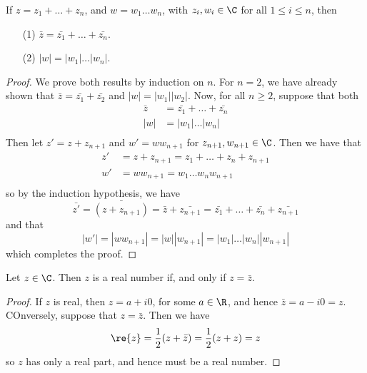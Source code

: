 \begin{corollary}
    If $z=z_1+\dots+z_n$, and $w=w_1 \dots w_n$, with $z_i,w_i \in \C$ for all
    $1 \leq i \leq n$, then
    \begin{enumerate}
        \item[(1)] $\bar{z}=\bar{z_1}+\dots+\bar{z_n}$.

        \item[(2)] $|w|=|w_1| \dots |w_n|$.
    \end{enumerate}
\end{corollary}
\begin{proof}
    We prove both results by induction on $n$. For  $n=2$, we have already shown
    that  $\bar{z}=\bar{z_1}+\bar{z_2}$ and $|w|=|w_1||w_2|$. Now, for
    all $n \geq 2$, suppose that both
    \begin{align*}
        \bar{z} &=  \bar{z_1}+\dots+\bar{z_n}   \\
        |w|   &=  |w_1| \dots |w_n|   \\
    \end{align*}
    Then let $z'=z+z_{n+1}$ and $w'=ww_{n+1}$ for $z_{n+1},w_{n+1} \in \C$. Then
    we have that
    \begin{align*}
        z'  &= z+z_{n+1}    = z_1+\dots+z_n+z_{n+1}   \\
        w'  &=  ww_{n+1}    =   w_1 \dots w_n w_{n+1}   \\
    \end{align*}
    so by the induction hypothesis, we have
    \begin{equation*}
        \bar{z'}=\bar{(z+z_{n+1})}=\bar{z}+\bar{z_{n+1}}=\bar{z_1}+\dots+\bar{z_n}+
        \bar{z_{n+1}}
    \end{equation*}
    and that
    \begin{equation*}
        |w'|=|ww_{n+1}|=|w||w_{n+1}|=|w_1| \dots |w_n| |w_{n+1}|
    \end{equation*}
    which completes the proof.
\end{proof}

\begin{lemma}\label{1.1.4}
    Let $z \in \C$. Then $z$ is a real number if, and only if  $z=\bar{z}$.
\end{lemma}
\begin{proof}
    If $z$ is real, then  $z=a+i0$, for some $a \in \R$, and hence
    $\bar{z}=a-i0=z$. COnversely, suppose that $z=\bar{z}$. Then we have
    \begin{equation*}
        \re{z}=\frac{1}{2}(z+\bar{z})=\frac{1}{2}(z+z)=z
    \end{equation*}
    so $z$ has only a real part, and hence must be a real number.
\end{proof}

